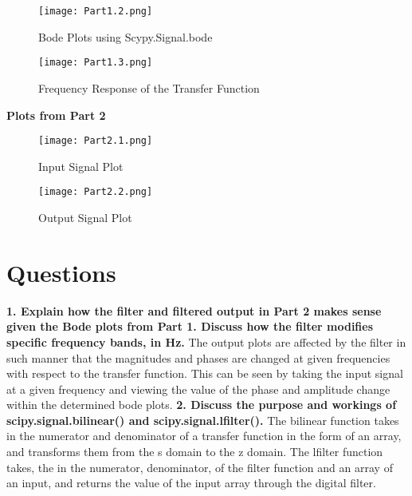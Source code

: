 \documentclass[12pt]{report}
\begin{document}
\begin{figure}[h!]
    \centering
    \texttt{[image: Part1.2.png]}
    \caption{Bode Plots using Scypy.Signal.bode }
    \label{Task 2}
\end{figure}

\begin{figure}[h!]
    \centering
    \texttt{[image: Part1.3.png]}
    \caption{Frequency Response of the Transfer Function }
    \label{Task 1}
    \newpage 
\end{figure}
\newpage 
\textbf{Plots from Part 2}
\begin{figure}[H]
    \centering
    \texttt{[image: Part2.1.png]}
    \caption{Input Signal Plot }
    \label{Task 1}
\end{figure}
\newpage 
\newpage
\begin{figure}[H]
    \centering
    \texttt{[image: Part2.2.png]}
    \caption{Output Signal Plot }
    \label{Task 1}
\end{figure}
 \newpage  

 
\section{Questions}
\textbf{1. Explain how the filter and filtered output in Part 2 makes sense given the Bode plots from
Part 1. Discuss how the filter modifies specific frequency bands, in Hz.}\newline \newline
The output plots are affected by the filter in such manner that the magnitudes and phases are changed at given frequencies with respect to the transfer function. This can be seen by taking the input signal at a given frequency and viewing the value of the phase and amplitude change within the determined bode plots. \newline \newline 
\textbf{2. Discuss the purpose and workings of
scipy.signal.bilinear() and scipy.signal.lfilter().}\newline\newline
The bilinear function takes in the numerator and denominator of a transfer function in the form of an array, and transforms them from the s domain to the z domain. The lfilter function takes, the in the numerator, denominator, of the filter function and an array of an input, and returns the value of the input array through the digital filter. \newline
\end{document}
